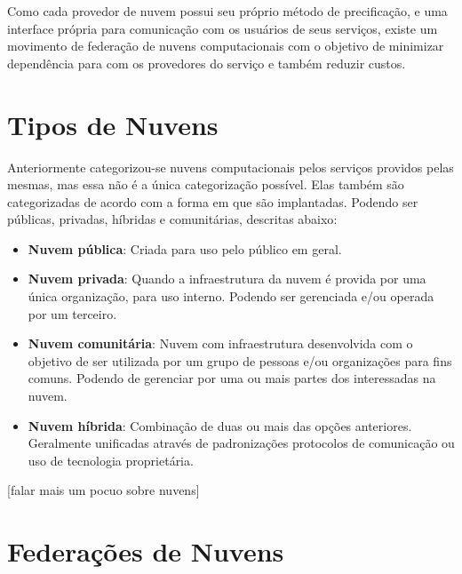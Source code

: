 Como cada provedor de nuvem possui seu próprio método de precificação, e uma interface própria para comunicação com os usuários de seus serviços, existe um movimento de federação de nuvens computacionais com o objetivo de minimizar dependência para com os provedores do serviço e também reduzir custos.

\section{Tipos de Nuvens}

Anteriormente categorizou-se nuvens computacionais pelos serviços providos pelas mesmas, mas essa não é a única categorização possível. Elas também são categorizadas de acordo com a forma em que são implantadas. Podendo ser públicas, privadas, híbridas e comunitárias, descritas abaixo\cite{NIST_CLOUD_DEFINITION}:

\begin{itemize}
	\item \textbf{Nuvem pública}: Criada para uso pelo público em geral.
	\item \textbf{Nuvem privada}: Quando a infraestrutura da nuvem é provida por uma única organização, para uso interno. Podendo ser gerenciada e/ou operada por um terceiro.
	\item \textbf{Nuvem comunitária}: Nuvem com infraestrutura desenvolvida com o objetivo de ser utilizada por um grupo de pessoas e/ou organizações para fins comuns. Podendo de gerenciar por uma ou mais partes dos interessadas na nuvem.
	\item \textbf{Nuvem híbrida}: Combinação de duas ou mais das opções anteriores. Geralmente unificadas através de padronizações protocolos de comunicação ou uso de tecnologia proprietária.
\end{itemize}

[falar mais um pocuo sobre nuvens]

\section{Federações de Nuvens}